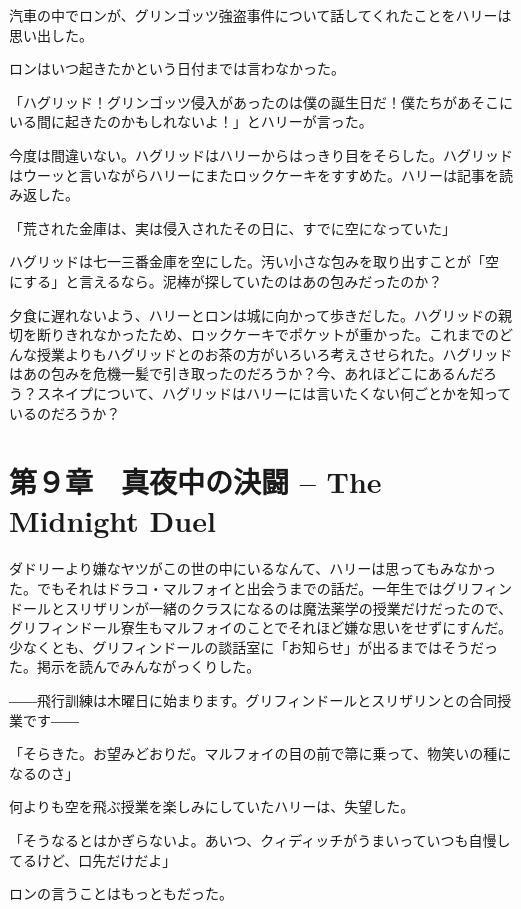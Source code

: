 \documentclass[10pt,a4paper]{article}
\begin{document}
\begin{CJK}{UTF8}{min}
汽車の中でロンが、グリンゴッツ強盗事件について話してくれたことをハリーは思い出した。

ロンはいつ起きたかという日付までは言わなかった。

「ハグリッド！グリンゴッツ侵入があったのは僕の誕生日だ！僕たちがあそこにいる間に起きたのかもしれないよ！」とハリーが言った。

今度は間違いない。ハグリッドはハリーからはっきり目をそらした。ハグリッドはウーッと言いながらハリーにまたロックケーキをすすめた。ハリーは記事を読み返した。

「荒された金庫は、実は侵入されたその日に、すでに空になっていた」

ハグリッドは七一三番金庫を空にした。汚い小さな包みを取り出すことが「空にする」と言えるなら。泥棒が探していたのはあの包みだったのか？

夕食に遅れないよう、ハリーとロンは城に向かって歩きだした。ハグリッドの親切を断りきれなかったため、ロックケーキでポケットが重かった。これまでのどんな授業よりもハグリッドとのお茶の方がいろいろ考えさせられた。ハグリッドはあの包みを危機一髪で引き取ったのだろうか？今、あれほどこにあるんだろう？スネイプについて、ハグリッドはハリーには言いたくない何ごとかを知っているのだろうか？




\section{第９章　真夜中の決闘 -- The Midnight Duel}





ダドリーより嫌なヤツがこの世の中にいるなんて、ハリーは思ってもみなかった。でもそれはドラコ・マルフォイと出会うまでの話だ。一年生ではグリフィンドールとスリザリンが一緒のクラスになるのは魔法薬学の授業だけだったので、グリフィンドール寮生もマルフォイのことでそれほど嫌な思いをせずにすんだ。少なくとも、グリフィンドールの談話室に「お知らせ」が出るまではそうだった。掲示を読んでみんながっくりした。

――飛行訓練は木曜日に始まります。グリフィンドールとスリザリンとの合同授業です――

「そらきた。お望みどおりだ。マルフォイの目の前で箒に乗って、物笑いの種になるのさ」

何よりも空を飛ぶ授業を楽しみにしていたハリーは、失望した。

「そうなるとはかぎらないよ。あいつ、クィディッチがうまいっていつも自慢してるけど、口先だけだよ」

ロンの言うことはもっともだった。


\end{CJK}
\end{document}
